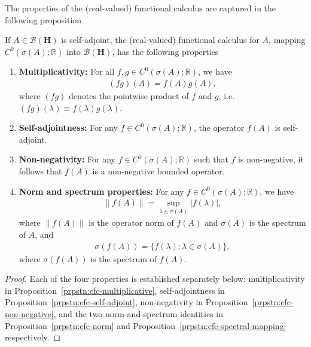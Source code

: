 The properties of the (real-valued) functional calculus are captured in the following proposition

\begin{proposition}
    \label{prpstn:hall-8.4}
    \leanok
    If $A \in \mathcal{B}(\mathbf{H})$ is self-adjoint, the (real-valued) functional calculus for $A$, mapping $C^0(\sigma(A); \mathbb{R})$ into $\mathcal{B}(\mathbf{H})$, has the following properties
    \begin{enumerate}
        \item \textbf{Multiplicativity:} For all $f,g \in C^0(\sigma(A); \mathbb{R})$, we have
        \begin{align}
            (fg)(A) = f(A)g(A),
        \end{align}
        where $(fg)$ denotes the pointwise product of $f$ and $g$, i.e. $(fg)(\lambda) \equiv f(\lambda)g(\lambda)$.
        \item \textbf{Self-adjointness:} For any $f \in C^0(\sigma(A); \mathbb{R})$, the operator $f(A)$ is self-adjoint.
        \item \textbf{Non-negativity:} For any $f \in C^0(\sigma(A); \mathbb{R})$ such that $f$ is non-negative, it follows that $f(A)$ is a non-negative bounded operator.
        \item \textbf{Norm and spectrum properties:} For any $f \in C^0(\sigma(A); \mathbb{R})$, we have
        \begin{align}
            \|f(A)\| = \sup\limits_{\lambda \in \sigma(A)} \lvert f(\lambda) \rvert,
        \end{align}
        where $\|f(A)\|$ is the operator norm of $f(A)$ and $\sigma(A)$ is the spectrum of $A$, and
        \begin{align}
            \sigma(f(A)) = \{ f(\lambda) : \lambda \in \sigma(A) \},
        \end{align}
        where $\sigma(f(A))$ is the spectrum of $f(A)$.
    \end{enumerate}
\end{proposition}
\begin{proof}
    \leanok
Each of the four properties is established separately below: multiplicativity in Proposition~\ref{prpstn:cfc-multiplicative}, self-adjointness in Proposition~\ref{prpstn:cfc-self-adjoint}, non-negativity in Proposition~\ref{prpstn:cfc-non-negative}, and the two norm-and-spectrum identities in Proposition~\ref{prpstn:cfc-norm} and Proposition~\ref{prpstn:cfc-spectral-mapping} respectively.
\end{proof}


